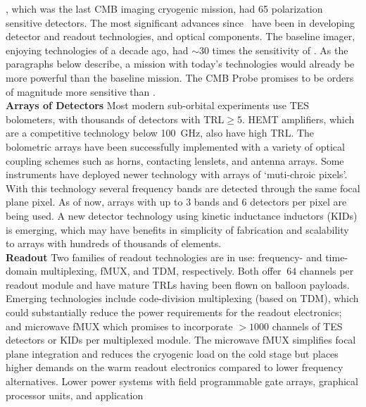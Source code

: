 \planck, which was the last CMB imaging cryogenic mission, had 65 polarization sensitive detectors. 
The most significant advances since \planck~have been in developing detector and readout technologies, and optical components.
The baseline imager, enjoying technologies of a decade ago, had $\sim$30 times the sensitivity of \planck.  
As the paragraphs below describe, a mission with today's technologies would already be 
more powerful than the baseline mission.  The CMB Probe promises to be orders of magnitude more 
sensitive than \planck.  \\
{\bf Arrays of Detectors} \hspace{0.1in} 
Most modern sub-orbital experiments use TES bolometers, with thousands of detectors with TRL$\geq 5$. 
HEMT amplifiers, which are a competitive technology below 100~GHz, also have high TRL.   
The bolometric arrays have been successfully implemented with a variety of optical coupling schemes such as horns, 
contacting lenslets, and antenna arrays. Some instruments have deployed newer technology with arrays of `muti-chroic pixels'. 
With this technology several frequency bands are detected through the same focal plane pixel. As of now, arrays with up 
to 3 bands and 6 detectors per pixel are being used. 
A new detector technology using kinetic inductance inductors (KIDs) is emerging, which may have benefits in simplicity 
of fabrication and scalability to arrays with hundreds of thousands of elements.  \\
{\bf Readout }  \hspace{0.1in} Two families of readout technologies are in use: frequency- and time-domain multiplexing, 
fMUX, and TDM, respectively.  Both offer $~64$ channels per readout module and have mature TRLs having been 
flown on balloon payloads.  
Emerging technologies include code-division multiplexing (based on TDM), which could 
substantially reduce the power requirements for the readout electronics; and microwave fMUX which promises to 
incorporate $>1000$ channels of TES detectors or KIDs per multiplexed module. The microwave fMUX simplifies 
focal plane integration and reduces the cryogenic load on the cold stage but places higher 
demands on the warm readout electronics compared to lower frequency alternatives. 
Lower power systems with field programmable gate arrays, graphical processor units, and application 
